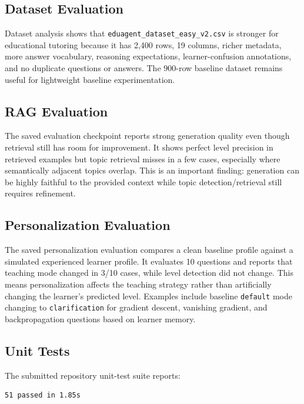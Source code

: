 \documentclass[11pt,a4paper]{article}
\begin{document}
\subsection{Dataset Evaluation}

Dataset analysis shows that \texttt{eduagent\_dataset\_easy\_v2.csv} is stronger for educational tutoring because it has 2,400 rows, 19 columns, richer metadata, more answer vocabulary, reasoning expectations, learner-confusion annotations, and no duplicate questions or answers. The 900-row baseline dataset remains useful for lightweight baseline experimentation.

\subsection{RAG Evaluation}

The saved evaluation checkpoint reports strong generation quality even though retrieval still has room for improvement. It shows perfect level precision in retrieved examples but topic retrieval misses in a few cases, especially where semantically adjacent topics overlap. This is an important finding: generation can be highly faithful to the provided context while topic detection/retrieval still requires refinement.

\subsection{Personalization Evaluation}

The saved personalization evaluation compares a clean baseline profile against a simulated experienced learner profile. It evaluates 10 questions and reports that teaching mode changed in 3/10 cases, while level detection did not change. This means personalization affects the teaching strategy rather than artificially changing the learner's predicted level. Examples include baseline \texttt{default} mode changing to \texttt{clarification} for gradient descent, vanishing gradient, and backpropagation questions based on learner memory.

\subsection{Unit Tests}

The submitted repository unit-test suite reports:

\begin{lstlisting}
51 passed in 1.85s
\end{lstlisting}
\end{document}
